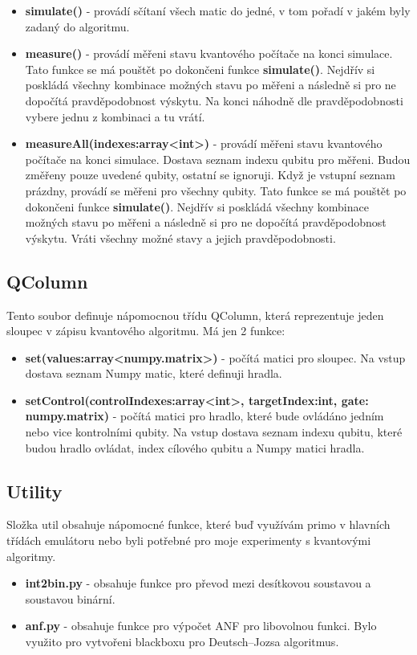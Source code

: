 \documentclass[11pt]{article}
\begin{document}
\begin{itemize}
    \item \textbf{simulate()} - provádí sčítaní všech matic do jedné, v tom pořadí v jakém byly zadaný do algoritmu.
    \item \textbf{measure()} - provádí měřeni stavu kvantového počítače na konci simulace.
          Tato funkce se má pouštět po dokončeni funkce \textbf{simulate()}.
          Nejdřív si poskládá všechny kombinace možných stavu po měřeni a následně si pro ne dopočítá pravděpodobnost výskytu.
          Na konci náhodně dle pravděpodobnosti vybere jednu z kombinaci a tu vrátí.
    \item \textbf{measureAll(indexes:array<int>)} - provádí měřeni stavu kvantového počítače na konci simulace.
          Dostava seznam indexu qubitu pro měřeni.
          Budou změřeny pouze uvedené qubity, ostatní se ignoruji.
          Když je vstupní seznam prázdny, provádí se měřeni pro všechny qubity.
          Tato funkce se má pouštět po dokončeni funkce \textbf{simulate()}.
          Nejdřív si poskládá všechny kombinace možných stavu po měřeni a následně si pro ne dopočítá pravděpodobnost výskytu.
          Vráti všechny možné stavy a jejich pravděpodobnosti.
\end{itemize}
\subsection{QColumn}
Tento soubor definuje nápomocnou třídu QColumn, která reprezentuje jeden sloupec v zápisu kvantového algoritmu.
Má jen 2 funkce:
\begin{itemize}
    \item \textbf{set(values:array<numpy.matrix>)} - počítá matici pro sloupec.
          Na vstup dostava seznam Numpy matic, které definuji hradla.
    \item \textbf{setControl(controlIndexes:array<int>, targetIndex:int, gate: numpy.matrix)} - počítá matici pro hradlo, které bude ovládáno jedním nebo vice kontrolními qubity.
          Na vstup dostava seznam indexu qubitu, které budou hradlo ovládat, index cílového qubitu a Numpy matici hradla.
\end{itemize}

\subsection{Utility}
Složka util obsahuje nápomocné funkce, které buď využívám primo v hlavních třídách emulátoru nebo byli potřebné pro moje experimenty s kvantovými algoritmy.
\begin{itemize}
    \item \textbf{int2bin.py} - obsahuje funkce pro převod mezi desítkovou soustavou a soustavou binární.
    \item \textbf{anf.py} - obsahuje funkce pro výpočet ANF pro libovolnou funkci.
          Bylo využito pro vytvořeni blackboxu pro Deutsch–Jozsa algoritmus.
\end{itemize}
\end{document}
